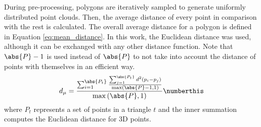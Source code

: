 During pre-processing, polygons are iteratively sampled to generate uniformly distributed point clouds. Then, the average distance of every point in comparison with the rest is calculated. The overall average distance for a polygon is defined in Equation \ref{eq:mean_distance}. In this work, the Euclidean distance was used, although it can be exchanged with any other distance function. Note that $\abs{P}-1$ is used instead of $\abs{P}$ to not take into account the distance of points with themselves in an efficient way. 
\begin{align*}
    d_{\mu} = \frac{\sum_{i=1}^{\abs{P_t}} \frac{\sum_{j=1}^{\abs{P_t}} d^{2}(p_{i} - p_{j})}{\max\left(\abs{P} - 1, 1\right)}}{\max\left(\abs{P}, 1\right)}
    \numberthis \label{eq:mean_distance}
\end{align*}
where $P_t$ represents a set of points in a triangle $t$ and the inner summation computes the Euclidean distance for 3D points.

